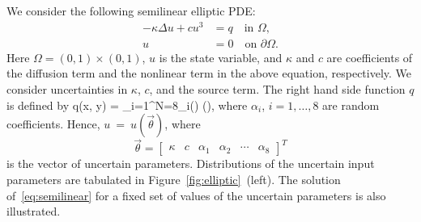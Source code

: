 We consider the following semilinear elliptic PDE: 
\begin{equation}\label{eq:semilinear}
\begin{aligned}
-\kappa \Delta u + c u^3 &= q \quad \text{in } \Omega,\\
 u &= 0 \quad \text{on } \partial \Omega.
\end{aligned}
\end{equation}
Here $\Omega = (0, 1)\times(0,1)$, 
$u$ is the state variable, and $\kappa$ and $c$ are coefficients of the diffusion term
and the nonlinear term in the above equation, respectively. 
We consider uncertainties in $\kappa$, $c$, and the source term. 
The right hand side function $q$ is defined by 
\be
q(x, y) = 
\sum\limits_{i=1}^{N=8}\alpha_i\sin\left(\right)
                               \cos\left(\right),
\label{eq:source}
\ee
where $\alpha_i$, $i = 1, \ldots, 8$ are random coefficients.
%
Hence, $u~=~u(\vec{\theta})$, where 
\[\vec{\theta} = 
\begin{bmatrix} \kappa & c & \alpha_1 & \alpha_2 & \cdots & \alpha_{8}
\end{bmatrix}^T
\] 
is the vector
of uncertain parameters. Distributions of the uncertain
input parameters are tabulated in Figure~\ref{fig:elliptic}~(left).
The solution of~\eqref{eq:semilinear} for
a fixed set of values of the uncertain parameters is also 
illustrated.


